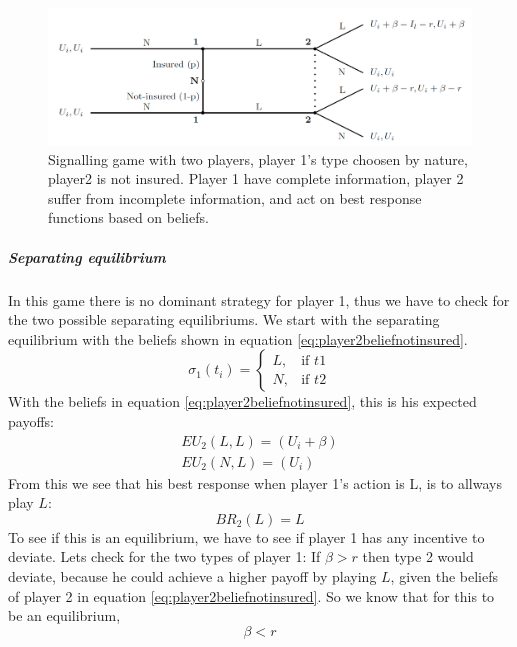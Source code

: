 \begin{figure}[h]
\centering

  \centering
\includegraphics[width=1\linewidth]{../Figures/SignalingGameNotInsured.png}

\caption{Signalling game with two players, player 1's type choosen by nature, player2 is not insured. Player 1 have complete information, player 2 suffer from incomplete information, and act on best response functions based on beliefs. \label{fig:signalingNotInsured}}

\end{figure}
\subparagraph{Separating equilibrium}
In this game there is no dominant strategy for player 1, thus we have to check for the two possible separating equilibriums.
We start with the separating equilibrium with the beliefs shown in equation \ref{eq:player2beliefnotinsured}.
\begin{equation}
    \sigma_{1}(t_{i})= 
\begin{cases}
   L,& \text{if } t1\\
   N,& \text{if } t2  
\end{cases}
\label{eq:player2beliefnotinsured}
\end{equation}
With the beliefs in equation \ref{eq:player2beliefnotinsured}, this is his expected payoffs:
\begin{eqnarray}
EU_{2}(L,L)=(U_{i}+\beta) \\
EU_{2}(N,L)=(U_{i})
\end{eqnarray}
From this we see that his best response when player 1's action is L, is to allways play $L$: \begin{equation}
BR_{2}(L)= L
\end{equation}
To see if this is an equilibrium, we have to see if player 1 has any incentive to deviate. 
Lets check for the two types of player 1:
If $\beta>r$ then type 2 would deviate, because he could achieve a higher payoff by playing $L$, given the beliefs of player 2 in equation \ref{eq:player2beliefnotinsured}. So we know that for this to be an equilibrium, \begin{equation}
\beta < r
\label{eq:sepcondition}
\end{equation}  
